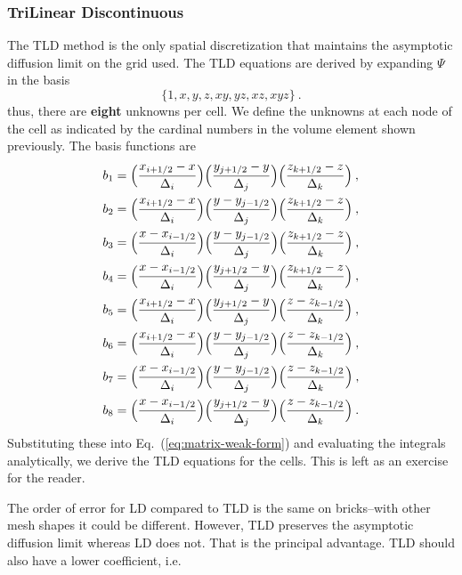 \documentclass[12pt]{article}
\newcommand{\Di}{\ensuremath{\Delta_i}}
\newcommand{\Dj}{\ensuremath{\Delta_j}}
\newcommand{\Dk}{\ensuremath{\Delta_k}}
\begin{document}
\subsubsection*{TriLinear Discontinuous}
The TLD method is the only spatial discretization that maintains the
asymptotic diffusion limit on the grid used.  The
TLD equations are derived by expanding $\Psi$ in the basis
\begin{equation*}
  \{1,x,y,z,xy,yz,xz,xyz\}\:.
\end{equation*}
thus, there are \textbf{eight} unknowns per cell.  We define the unknowns at each node
of the cell as indicated by the cardinal numbers in the volume element shown previously.
The basis functions are
\begin{equation}
  \begin{aligned}
    b_1 &= \Bigl(\frac{x_{i+1/2}-x}{\Di}\Bigr)
    \Bigl(\frac{y_{j+1/2}-y}{\Dj}\Bigr) \Bigl(\frac{z_{k+1/2}-z}{\Dk}\Bigr)\:,\\
    b_2 &= \Bigl(\frac{x_{i+1/2}-x}{\Di}\Bigr)
    \Bigl(\frac{y-y_{j-1/2}}{\Dj}\Bigr) \Bigl(\frac{z_{k+1/2}-z}{\Dk}\Bigr)\:,\\
    b_3 &= \Bigl(\frac{x-x_{i-1/2}}{\Di}\Bigr)
    \Bigl(\frac{y-y_{j-1/2}}{\Dj}\Bigr) \Bigl(\frac{z_{k+1/2}-z}{\Dk}\Bigr)\:,\\
    b_4 &= \Bigl(\frac{x-x_{i-1/2}}{\Di}\Bigr)
    \Bigl(\frac{y_{j+1/2}-y}{\Dj}\Bigr) \Bigl(\frac{z_{k+1/2}-z}{\Dk}\Bigr)\:,\\
    b_5 &= \Bigl(\frac{x_{i+1/2}-x}{\Di}\Bigr)
    \Bigl(\frac{y_{j+1/2}-y}{\Dj}\Bigr) \Bigl(\frac{z-z_{k-1/2}}{\Dk}\Bigr)\:,\\
    b_6 &= \Bigl(\frac{x_{i+1/2}-x}{\Di}\Bigr)
    \Bigl(\frac{y-y_{j-1/2}}{\Dj}\Bigr) \Bigl(\frac{z-z_{k-1/2}}{\Dk}\Bigr)\:,\\
    b_7 &= \Bigl(\frac{x-x_{i-1/2}}{\Di}\Bigr)
    \Bigl(\frac{y-y_{j-1/2}}{\Dj}\Bigr) \Bigl(\frac{z-z_{k-1/2}}{\Dk}\Bigr)\:,\\
    b_8 &= \Bigl(\frac{x-x_{i-1/2}}{\Di}\Bigr)
    \Bigl(\frac{y_{j+1/2}-y}{\Dj}\Bigr) \Bigl(\frac{z-z_{k-1/2}}{\Dk}\Bigr)\:.
  \end{aligned}
  \label{eq:tld_basis}
\end{equation}
Substituting these into Eq.~(\ref{eq:matrix-weak-form}) and evaluating the
integrals analytically, we derive the TLD equations for the cells. This is left as an exercise for the reader.

The order of error for LD compared to TLD is the same on bricks--with other mesh shapes it could be different. However, TLD preserves the asymptotic diffusion limit whereas LD does not. That is the principal advantage. TLD should also have a lower coefficient, i.e.
\end{document}
